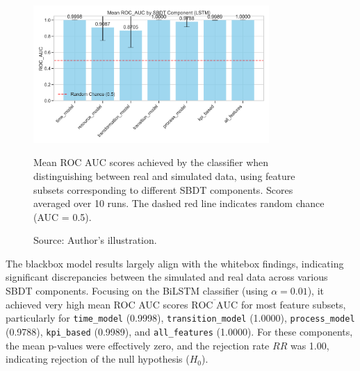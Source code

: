 \begin{figure}[htbp]
    \centering
    \includegraphics[width=0.8\textwidth]{figures/lstm-roc-auc-by-component.png}
    \caption[Results Blackbox model]{Mean ROC AUC scores achieved by the classifier when distinguishing between real and simulated data, using feature subsets corresponding to different SBDT components. Scores averaged over 10 runs. The dashed red line indicates random chance (AUC = 0.5).}
    \label{fig:bilstm-roc-auc}
    \caption*{Source: Author's illustration.}
\end{figure}

The blackbox model results largely align with the whitebox findings, indicating significant discrepancies between the simulated and real data across various SBDT components. Focusing on the BiLSTM classifier (using $\alpha = 0.01$), it achieved very high mean ROC AUC scores $\overline{\text{ROC AUC}}$ for most feature subsets, particularly for \texttt{time\_model} (0.9998), \texttt{transition\_model} (1.0000), \texttt{process\_model} (0.9788), \texttt{kpi\_based} (0.9989), and \texttt{all\_features} (1.0000). For these components, the mean p-values were effectively zero, and the rejection rate $RR$ was 1.00, indicating rejection of the null hypothesis ($H_0$).


